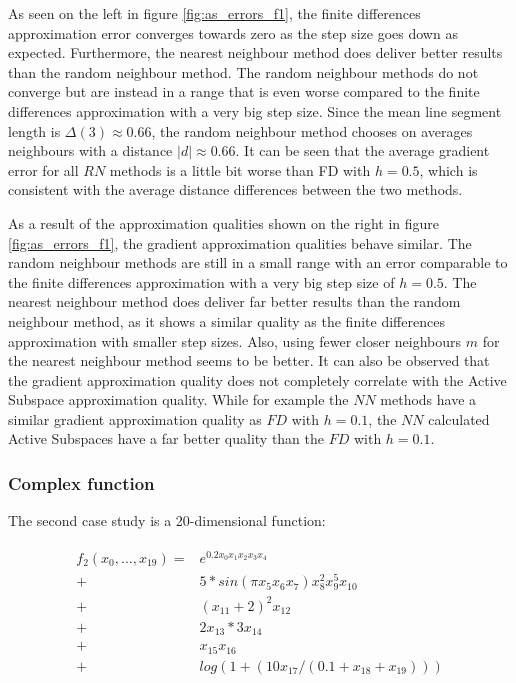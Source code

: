 \documentclass[
  a4paper,  %
  twoside,  %
  bibliography=totoc,
  headsepline,
  cleardoublepage=empty,
  parskip=half,
  draft=false
]{scrbook}
\begin{document}
As seen on the left in figure \ref{fig:as_errors_f1}, the finite differences approximation error converges towards zero as the step size goes down as expected.
Furthermore, the nearest neighbour method does deliver better results than the random neighbour method.
The random neighbour methods do not converge but are instead in a range that is even worse compared to the finite differences approximation with a very big step size.
Since the mean line segment length is $\Delta(3) \approx 0.66$, the random neighbour method chooses on averages neighbours with a distance $|d| \approx 0.66$.
It can be seen that the average gradient error for all $RN$ methods is a little bit worse than FD with $h=0.5$, which is consistent with the average distance differences between the two methods.

As a result of the approximation qualities shown on the right in figure \ref{fig:as_errors_f1}, the gradient approximation qualities behave similar.
The random neighbour methods are still in a small range with an error comparable to the finite differences approximation with a very big step size of $h=0.5$.
The nearest neighbour method does deliver far better results than the random neighbour method, as it shows a similar quality as the finite differences approximation with smaller step sizes.
Also, using fewer closer neighbours $m$ for the nearest neighbour method seems to be better.
It can also be observed that the gradient approximation quality does not completely correlate with the Active Subspace approximation quality.
While for example the $NN$ methods have a similar gradient approximation quality as $FD$ with $h=0.1$, the $NN$ calculated Active Subspaces have a far better quality than the $FD$ with $h=0.1$.

\newpage

\subsubsection{Complex function}

The second case study is a 20-dimensional function:

\begin{align}
\begin{split}
f_2(x_0, \dots, x_{19})=&e^{0.2 x_0 x_1 x_2 x_3 x_4}\\
+ &5 * sin(\pi x_5 x_6 x_7) x_8^2 x_9^5 x_{10}\\
+ &(x_{11} + 2)^2 x_{12}\\
+ &2 x_{13} * 3 x_{14}\\
+ &x_{15} x_{16}\\
+ &log(1 + (10 x_{17} / (0.1 + x_{18} + x_{19})))
\end{split}
\end{align}
\end{document}
